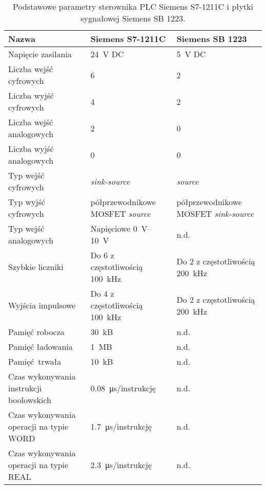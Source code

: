\begin{table}[H]
    \centering
    \begin{threeparttable}
        \caption{Podstawowe parametry sterownika PLC Siemens S7-1211C i płytki sygnałowej Siemens SB 1223.}
        \label{tab:parametry_PLC_SB}
        
        \begin{tabularx}{\textwidth}{p{5cm} | p{5cm} | p{5cm} }
            \toprule
            Nazwa & Siemens S7-1211C & Siemens SB 1223 \\
            \midrule
            Napięcie zasilania & \SI{24}{V} DC & \SI{5}{V} DC \\
            \midrule
            Liczba wejść cyfrowych & 6 & 2 \\
            Liczba wyjść cyfrowych & 4 & 2 \\
            Liczba wejść analogowych & 2 & 0 \\
            Liczba wyjść analogowych & 0 & 0 \\
            Typ wejść cyfrowych & \textit{sink-source} & \textit{source} \\
            Typ wyjść cyfrowych & półprzewodnikowe MOSFET \textit{source} & półprzewodnikowe MOSFET \textit{sink-source} \\
            Typ wejść analogowych & Napięciowe \SIrange{0}{10}{V} & n.d. \\
            \midrule
            Szybkie liczniki & Do 6 z częstotliwością \SI{100}{kHz}\tnote{b} & Do 2 z częstotliwością \SI{200}{kHz}\tnote{c} \\
            Wyjścia impulsowe & Do 4 z częstotliwością \SI{100}{kHz} & Do 2 z częstotliwością \SI{200}{kHz} \\
            \midrule
            Pamięć robocza & \SI{30}{kB} & n.d. \\
            Pamięć ładowania & \SI{1}{MB} & n.d. \\
            Pamięć trwała & \SI{10}{kB} & n.d. \\
            \midrule
            Czas wykonywania instrukcji boolowskich & \SI{0,08}{\micro\second}/instrukcję & n.d. \\
            Czas wykonywania operacji na typie WORD & \SI{1,7}{\micro\second}/instrukcję & n.d. \\
            Czas wykonywania operacji na typie REAL & \SI{2,3}{\micro\second}/instrukcję & n.d. \\
            \bottomrule
        \end{tabularx}
        

\end{threeparttable}
\end{table}
